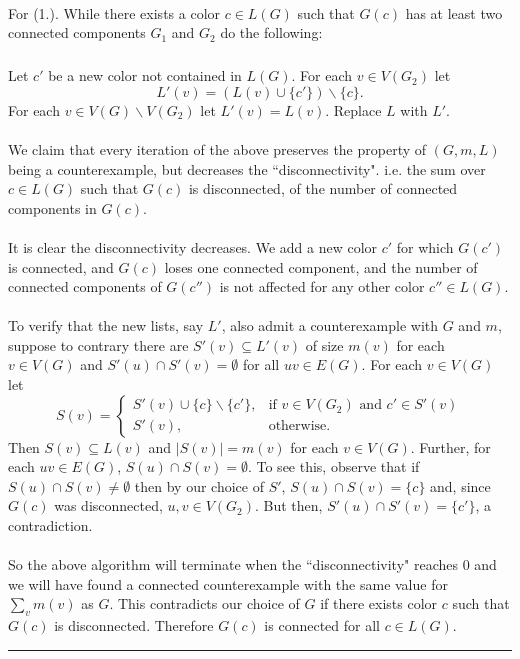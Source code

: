 \documentclass[letterpaper,12pt,oneside,onecolumn]{article}
\newenvironment{proof}{{\bf Proof:  }}{\hfill\rule{2mm}{2mm}}
\begin{document}
\begin{proof}
	\paragraph{} For (1.). While there exists a color $c \in L(G)$ such that $G(c)$ has at least two connected components $G_1$ and $G_2$ do the following:
		\subparagraph{}
		Let $c'$ be a new color not contained in $L(G)$. For each $v \in V(G_2)$ let $$L'(v) = (L(v)\cup \{c'\}) \backslash \{c\}.$$ For each $v \in V(G) \backslash V(G_2)$ let $L'(v) = L(v)$. Replace $L$ with $L'$.
	\paragraph{}
	We claim that every iteration of the above preserves the property of $(G,m,L)$ being a counterexample, but decreases the ``disconnectivity". i.e. the sum over $c \in L(G)$ such that $G(c)$ is disconnected, of the number of connected components in $G(c)$.
	\paragraph{}
	It is clear the disconnectivity decreases. We add a new color $c'$ for which $G(c')$ is connected, and $G(c)$ loses one connected component, and the number of connected components of $G(c'')$ is not affected for any other color $c'' \in L(G)$.
	\paragraph{}
	To verify that the new lists, say $L'$, also admit a counterexample with $G$ and $m$, suppose to contrary there are $S'(v) \subseteq L'(v)$ of size $m(v)$ for each $v \in V(G)$ and $S'(u) \cap S'(v) = \emptyset$ for all $uv \in E(G)$. For each $v \in V(G)$ let $$S(v) = \begin{cases} S'(v)\cup \{c\} \backslash \{c'\}, &\text{if } v \in V(G_2) \text{ and } c' \in S'(v) \\
	S'(v), &\text{otherwise}.\end{cases} $$
	Then $S(v) \subseteq L(v)$ and $|S(v)| = m(v)$ for each $v \in V(G)$. Further, for each $uv \in E(G)$, $S(u) \cap S(v) = \emptyset$. To see this, observe that if $S(u) \cap S(v) \neq \emptyset$ then by our choice of $S'$, $S(u) \cap S(v) = \{c\}$ and, since $G(c)$ was disconnected, $u, v \in V(G_2)$. But then, $S'(u) \cap S'(v) = \{c'\}$, a contradiction.
	\paragraph{}
	So the above algorithm will terminate when the ``disconnectivity" reaches $0$ and we will have found a connected counterexample with the same value for $\sum_{v} m(v)$ as $G$. This contradicts our choice of $G$ if there exists color $c$ such that $G(c)$ is disconnected. Therefore $G(c)$ is connected for all $c \in L(G)$.

\end{proof}
\end{document}
